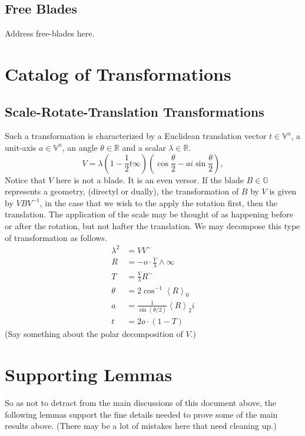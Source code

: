 \documentclass[12pt]{article}
\newcommand{\G}{\mathbb{G}}
\newcommand{\V}{\mathbb{V}}
\newcommand{\R}{\mathbb{R}}
\newcommand{\nvao}{o}
\newcommand{\nvai}{\infty}
\begin{document}
\subsection{Free Blades}

Address free-blades here.

\section{Catalog of Transformations}

\subsection{Scale-Rotate-Translation Transformations}

Such a transformation is characterized by a Euclidean translation vector $t\in\V^n$, a unit-axis $a\in\V^n$,
an angle $\theta\in\R$ and a scalar $\lambda\in\R$.
\begin{equation*}
V = \lambda\left(1-\frac{1}{2}t\nvai\right)\left(\cos\frac{\theta}{2}-ai\sin\frac{\theta}{2}\right),
\end{equation*}
Notice that $V$ here is not a blade.  It is an even versor.  If the blade $B\in\G$ represents
a geometry, (directyl or dually), the transformation of $B$ by $V$ is given by $VBV^{-1}$,
in the case that we wish to the apply the rotation first, then the translation.  The application
of the scale may be thought of as happening before or after the rotation, but not hafter the translation.
We may decompose this type of transformation as follows.
\begin{align*}
\lambda^2 &= VV^{\sim} \\
R &= -\nvao\cdot\frac{V}{\lambda}\wedge\nvai \\
T &= \frac{V}{\lambda}R^{\sim} \\
\theta &= 2\cos^{-1}\left\langle R\right\rangle_0 \\
a &= \frac{1}{\sin(\theta/2)}\left\langle R\right\rangle_2 i \\
t &= 2\nvao\cdot(1-T)
\end{align*}
(Say something about the polar decomposition of $V$.)

\section{Supporting Lemmas}

So as not to detract from the main discussions of this document above, the following
lemmas support the fine details needed to prove some of the main results above.
(There may be a lot of mistakes here that need cleaning up.)
\end{document}
